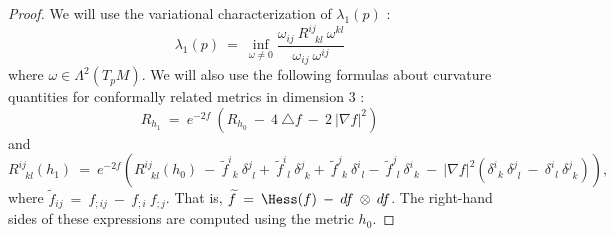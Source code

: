 \begin{proof}
We will use the variational characterization of $\lambda_1(p)$ :
\begin{equation} \label{Rvar}
\lambda_1(p) \: = \:
\inf_{\omega \neq 0} \frac{\omega_{ij} \: R^{ij}_{\: \: \: kl} \: \omega^{kl}}{\omega_{ij} \: \omega^{ij}}
\end{equation}
where $\omega \in \Lambda^2(T_pM)$.
We will also use the following formulas about curvature quantities for
conformally related metrics in dimension $3$ :
\begin{equation} \label{confscalar}
R_{h_1} \: = \: e^{-2f} \: \left( R_{h_0} \:  - \: 4 \: \triangle f \: - \: 2 \: |\nabla f|^2 \right)
\end{equation}
and
\begin{equation} \label{confcurv}
R^{ij}_{\: \: \: kl}(h_1) \:  = \: e^{-2f} \left( R^{ij}_{\: \: \: kl}(h_0) \: - \: \widetilde{f}^i_{\: \: k} \:
\delta^j_{\: \: l}
 + \: \widetilde{f}^i_{\: \: l} \:
\delta^j_{\: \: k}
 + \: \widetilde{f}^j_{\: \: k} \:
\delta^i_{\: \: l}
 - \: \widetilde{f}^j_{\: \: l} \:
\delta^i_{\: \: k} \: - \: |\nabla f|^2
\left( \delta^i_{\: \: k} \: \delta^j_{\: \: l} \: - \:
\delta^i_{\: \: l} \: \delta^j_{\: \: k} \right)
\right),
\end{equation}
where $\widetilde{f}_{ij} \: = \: f_{;ij} \: - \: f_{;i} \: f_{;j}$. That is,
$\widetilde{f} \: = \: \Hess(f) \: - \: df \: \otimes \: df$. The right-hand sides of these
expressions are
computed using the metric $h_0$.


\end{proof}
